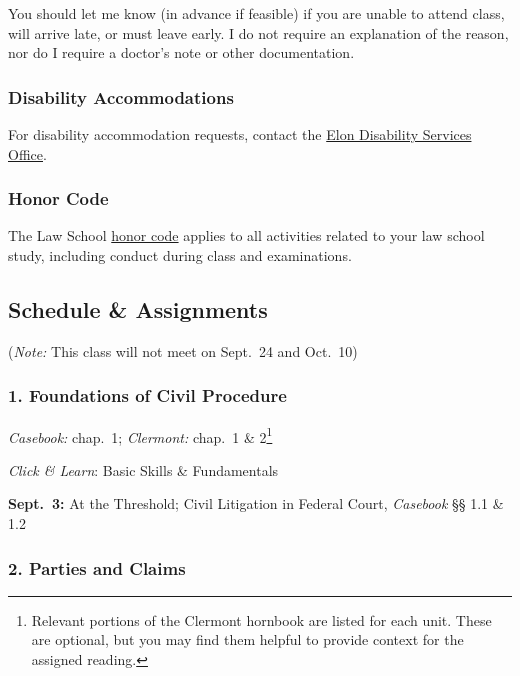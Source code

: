 \documentclass[11pt,letterpaper,twoside]{article}
\begin{document}
You should let me know (in advance if feasible) if you are unable to
attend class, will arrive late, or must leave early. I do not require an
explanation of the reason, nor do I require a doctor's note or other
documentation.

\subsubsection{Disability
Accommodations}\label{disability-accommodations}

For disability accommodation requests, contact the
\href{https://www.elon.edu/u/academics/koenigsberger-learning-center/disabilities-resources/homepage/graduate-student-resources/}{Elon
Disability Services Office}.

\subsubsection{Honor Code}\label{honor-code}

The Law School
\href{https://www.elon.edu/u/law/students/honor-code/}{honor code}
applies to all activities related to your law school study, including
conduct during class and examinations.

\subsection{Schedule \& Assignments}\label{schedule-assignments}

(\emph{Note:} This class will not meet on Sept.~24 and Oct.~10)

\subsubsection{1. Foundations of Civil
Procedure}\label{foundations-of-civil-procedure}

\emph{Casebook:} chap.~1; \emph{Clermont:} chap.~1 \& 2\footnote{Relevant
  portions of the Clermont hornbook are listed for each unit. These are
  optional, but you may find them helpful to provide context for the
  assigned reading.}

\emph{Click \& Learn}: Basic Skills \& Fundamentals

\textbf{Sept.~3:} At the Threshold; Civil Litigation in Federal Court,
\emph{Casebook} §§ 1.1 \& 1.2

\subsubsection{2. Parties and Claims}\label{parties-and-claims}
\end{document}
